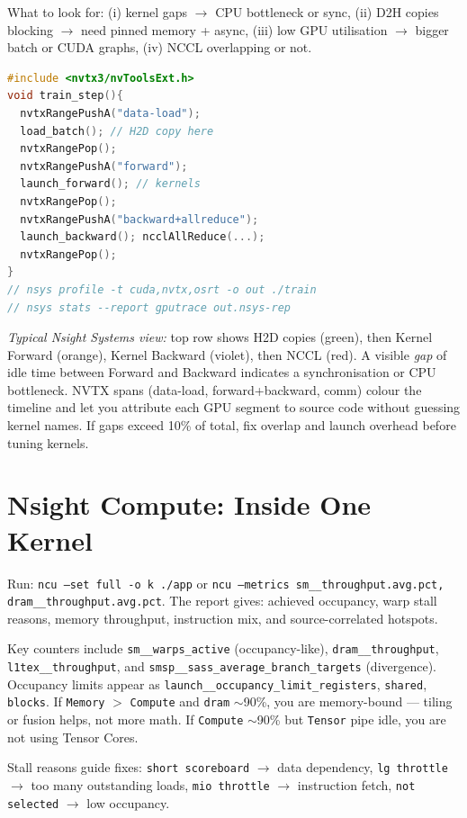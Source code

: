 What to look for: (i) kernel gaps $\to$ CPU bottleneck or sync, (ii) D2H copies blocking $\to$ need pinned memory + async, (iii) low GPU utilisation $\to$ bigger batch or CUDA graphs, (iv) NCCL overlapping or not.

\begin{lstlisting}[language=C++, caption={NVTX annotation: mark phases so Nsight Systems shows them as colored spans.}]
#include <nvtx3/nvToolsExt.h>
void train_step(){
  nvtxRangePushA("data-load");
  load_batch(); // H2D copy here
  nvtxRangePop();
  nvtxRangePushA("forward");
  launch_forward(); // kernels
  nvtxRangePop();
  nvtxRangePushA("backward+allreduce");
  launch_backward(); ncclAllReduce(...);
  nvtxRangePop();
}
// nsys profile -t cuda,nvtx,osrt -o out ./train
// nsys stats --report gputrace out.nsys-rep
\end{lstlisting}

\noindent\textit{Typical Nsight Systems view:} top row shows 
H2D copies (green), then Kernel Forward (orange), Kernel Backward (violet), then NCCL (red). 
A visible \emph{gap} of idle time between Forward and Backward indicates a synchronisation 
or CPU bottleneck. NVTX spans (data-load, forward+backward, comm) colour the timeline 
and let you attribute each GPU segment to source code without guessing kernel names. 
If gaps exceed 10\% of total, fix overlap and launch overhead before tuning kernels.

\section{Nsight Compute: Inside One Kernel}
Run: \texttt{ncu --set full -o k ./app} or \texttt{ncu --metrics sm\_\_throughput.avg.pct,\\dram\_\_throughput.avg.pct}. The report gives: achieved occupancy, warp stall reasons, memory throughput, instruction mix, and source-correlated hotspots.

Key counters include \texttt{sm\_\_warps\_active} (occupancy-like), \texttt{dram\_\_throughput}, \texttt{l1tex\_\_throughput}, and \texttt{smsp\_\_sass\_average\_branch\_targets} (divergence). Occupancy limits appear as \texttt{launch\_\_occupancy\_limit\_registers}, \texttt{shared}, \texttt{blocks}. If \texttt{Memory} $>$ \texttt{Compute} and \texttt{dram} $\sim$90\%, you are memory-bound --- tiling or fusion helps, not more math. If \texttt{Compute} $\sim$90\% but \texttt{Tensor} pipe idle, you are not using Tensor Cores.

Stall reasons guide fixes: \texttt{short scoreboard} $\to$ data dependency, \texttt{lg throttle} $\to$ too many outstanding loads, \texttt{mio throttle} $\to$ instruction fetch, \texttt{not selected} $\to$ low occupancy.

